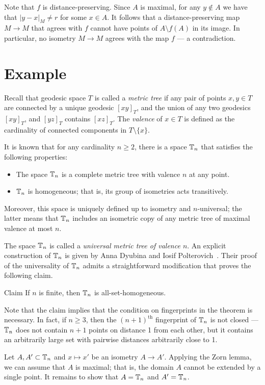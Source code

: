 \documentclass[a4paper,10pt]{article}
\begin{document}
Note that $f$ is distance-preserving.
Since $A$ is maximal, for any $y\notin A$ we have that $|y-x|_M\ne r$ for some $x\in A$.
It follows that a distance-preserving map $M\to M$ that agrees with $f$ cannot have points of $A\setminus f(A)$ in its image.
In particular, no isometry $M\to M$ agrees with the map $f$ --- a contradiction.
\qeds

\section{Example}

Recall that geodesic space $T$ is called a \emph{metric tree} if any pair of points $x,y\in T$ are connected by a unique geodesic $[xy]_T$,
and the union of any two geodesics $[xy]_T$, and $[yz]_T$ contains $[xz]_T$.
The \emph{valence} of $x\in T$ is defined as the cardinality of connected components in $T\setminus \{x\}$.

It is known that for any cardinality $n\ge 2$, there is a space $\mathbb{T}_n$ that satisfies the following properties:
\begin{itemize}
\item The space $\mathbb{T}_n$ is a complete metric tree with valence $n$ at any point.
\item $\mathbb{T}_n$ is homogeneous; that is, its group of isometries acts transitively. 
\end{itemize}
Moreover, this space is uniquely defined up to isometry and $n$-universal; the latter means that $\mathbb{T}_n$ includes an isometric copy of any metric tree of maximal valence at most $n$.

The space $\mathbb{T}_n$ is called
a \emph{universal metric tree of valence $n$}.
An explicit construction of $\mathbb{T}_n$ is given by Anna Dyubina and Iosif Polterovich~\cite{dyubina-polterovich}.
Their proof of the universality of $\mathbb{T}_n$ admits a straightforward modification that proves the following claim. 

\begin{thm}{Claim}
If $n$ is finite, then $\mathbb{T}_n$ is all-set-homogeneous.
\end{thm}

Note that the claim implies that the condition on fingerprints in the theorem is necessary.
In fact, if $n\ge 3$, then the $(n+1)^{\text{th}}$ fingerprint of $\mathbb{T}_n$ is not closed --- $\mathbb{T}_n$ does not contain $n+1$ points on distance 1 from each other,
but it contains an arbitrarily large set with pairwise distances arbitrarily close to 1.


Let $A, A'\subset \mathbb{T}_n$ and $x\mapsto x'$ be an isometry $A\to A'$.
Applying the Zorn lemma, we can assume that $A$ is maximal; that is, the domain $A$ cannot be extended by a single point.
It remains to show that $A=\mathbb{T}_n$ and $A'=\mathbb{T}_n$.
\end{document}
